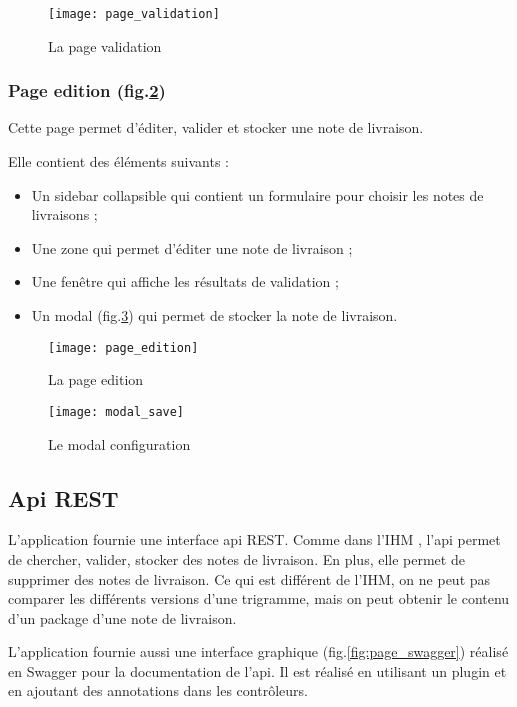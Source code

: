 \begin{figure}[ht]
 \centering
 \texttt{[image: page\_validation]}
 \caption{La page validation}
 \label{fig:page_validation}
\end{figure}

\subsubsection{Page edition (fig.\ref{fig:page_edition})}
Cette page permet d'éditer, valider et stocker une note de livraison.

Elle contient des éléments suivants :
\begin{itemize}
 \item Un sidebar collapsible qui contient un formulaire pour choisir les notes de livraisons ;
 \item Une zone qui permet d'éditer une note de livraison ;
 \item Une fenêtre qui affiche les résultats de validation ;
 \item Un modal (fig.\ref{fig:modal_save}) qui permet de stocker la note de livraison.
\end{itemize}

\begin{figure}[ht]
 \centering
 \texttt{[image: page\_edition]}
 \caption{La page edition}
 \label{fig:page_edition}
\end{figure}

\begin{figure}[ht]
 \centering
 \texttt{[image: modal\_save]}
 \caption{Le modal configuration}
 \label{fig:modal_save}
\end{figure}

\subsection{Api REST}
L'application fournie une interface api REST.
Comme dans l'IHM , l'api permet de chercher, valider, stocker des notes de livraison.
En plus, elle permet de supprimer des notes de livraison.
Ce qui est différent de l'IHM, on ne peut pas comparer les différents versions d'une trigramme, mais on peut obtenir le contenu d'un package d'une note de livraison.

L'application fournie aussi une interface graphique (fig.\ref{fig:page_swagger}) réalisé en Swagger pour la documentation de l'api.
Il est réalisé en utilisant un plugin et en ajoutant des annotations dans les contrôleurs.

